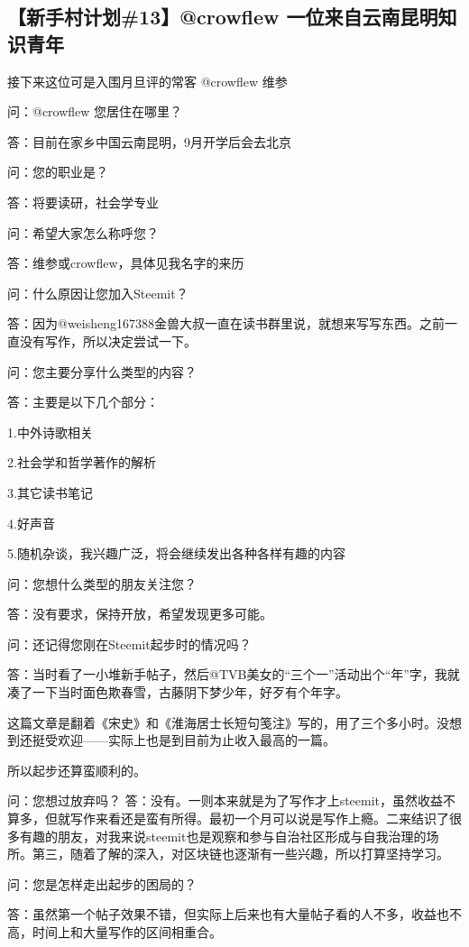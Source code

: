 \documentclass[]{ctexbook}
\begin{document}
\hypertarget{13crowflew-}{%
\subsection{【新手村计划\#13】@crowflew 一位来自云南昆明知识青年}\label{13crowflew-}}

接下来这位可是入围月旦评的常客 @crowflew 维参

问：@crowflew 您居住在哪里？

答：目前在家乡中国云南昆明，9月开学后会去北京

问：您的职业是？

答：将要读研，社会学专业

问：希望大家怎么称呼您？

答：维参或crowflew，具体见我名字的来历

问：什么原因让您加入Steemit？

答：因为@weisheng167388金兽大叔一直在读书群里说，就想来写写东西。之前一直没有写作，所以决定尝试一下。

问：您主要分享什么类型的内容？

答：主要是以下几个部分：

1.中外诗歌相关

2.社会学和哲学著作的解析

3.其它读书笔记

4.好声音

5.随机杂谈，我兴趣广泛，将会继续发出各种各样有趣的内容

问：您想什么类型的朋友关注您？

答：没有要求，保持开放，希望发现更多可能。

问：还记得您刚在Steemit起步时的情况吗？

答：当时看了一小堆新手帖子，然后@TVB美女的``三个一''活动出个``年''字，我就凑了一下当时面色欺春雪，古藤阴下梦少年，好歹有个年字。

这篇文章是翻着《宋史》和《淮海居士长短句笺注》写的，用了三个多小时。没想到还挺受欢迎------实际上也是到目前为止收入最高的一篇。

所以起步还算蛮顺利的。

问：您想过放弃吗？
答：没有。一则本来就是为了写作才上steemit，虽然收益不算多，但就写作来看还是蛮有所得。最初一个月可以说是写作上瘾。二来结识了很多有趣的朋友，对我来说steemit也是观察和参与自治社区形成与自我治理的场所。第三，随着了解的深入，对区块链也逐渐有一些兴趣，所以打算坚持学习。

问：您是怎样走出起步的困局的？

答：虽然第一个帖子效果不错，但实际上后来也有大量帖子看的人不多，收益也不高，时间上和大量写作的区间相重合。
\end{document}
